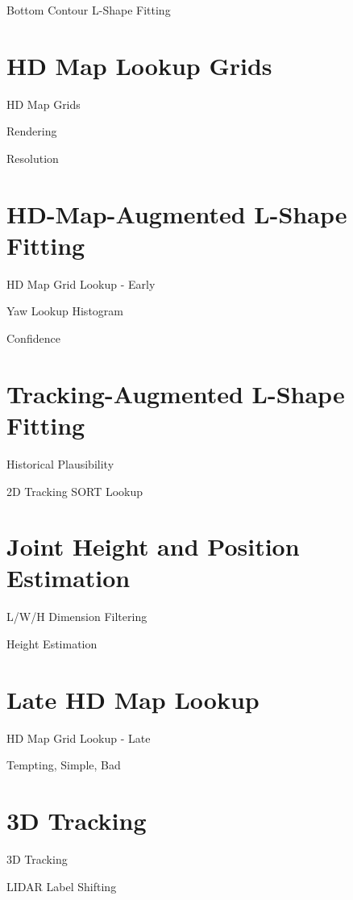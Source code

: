 Bottom Contour L-Shape Fitting


\section{HD Map Lookup Grids}
\label{sec:hdmapgrids}

HD Map Grids \par
Rendering \par
Resolution


\section{HD-Map-Augmented L-Shape Fitting}
\label{sec:hdmaplsf}

HD Map Grid Lookup - Early \par
Yaw Lookup Histogram \par
Confidence


\section{Tracking-Augmented L-Shape Fitting}
\label{sec:trackinglsf}

Historical Plausibility \par
2D Tracking SORT Lookup


\section{Joint Height and Position Estimation}
\label{sec:size}

L/W/H Dimension Filtering \par
Height Estimation


\section{Late HD Map Lookup}
\label{sec:hdmaplate}

HD Map Grid Lookup - Late \par
Tempting, Simple, Bad


\section{3D Tracking}
\label{sec:trackthreed}

3D Tracking \par
LIDAR Label Shifting
